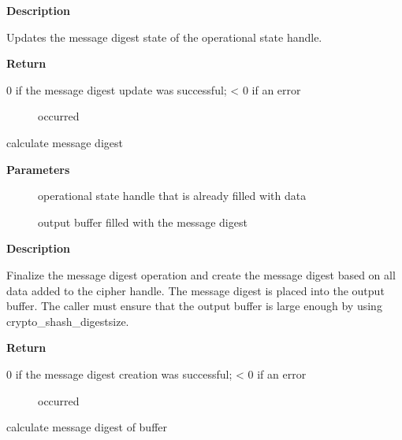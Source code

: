 \documentclass[a4paper,8pt,english]{sphinxmanual}
\begin{document}
\textbf{Description}

Updates the message digest state of the operational state handle.

\textbf{Return}
\begin{description}
\item[{0 if the message digest update was successful; \textless{} 0 if an error}] \leavevmode
occurred

\end{description}

\begin{fulllineitems}
\label{crypto/api-digest:c.crypto_shash_final}
calculate message digest

\end{fulllineitems}


\textbf{Parameters}
\begin{description}
\item[{}] \leavevmode
operational state handle that is already filled with data

\item[{}] \leavevmode
output buffer filled with the message digest

\end{description}

\textbf{Description}

Finalize the message digest operation and create the message digest
based on all data added to the cipher handle. The message digest is placed
into the output buffer. The caller must ensure that the output buffer is
large enough by using crypto\_shash\_digestsize.

\textbf{Return}
\begin{description}
\item[{0 if the message digest creation was successful; \textless{} 0 if an error}] \leavevmode
occurred

\end{description}

\begin{fulllineitems}
\label{crypto/api-digest:c.crypto_shash_finup}
calculate message digest of buffer

\end{fulllineitems}
\end{document}
